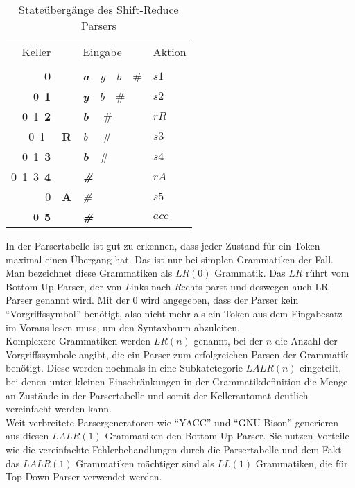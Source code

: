 \begin{table}[H]
  \centering
  \begin{tabular}{r|l|l|l}
    Keller                   &             &  Eingabe                        & Aktion                    \\
    \qquad\qquad\qquad\qquad &             &  \qquad\qquad\qquad\qquad\qquad                        & \qquad                    \\
               \textbf{0}    &             &  \textit{\textbf{a}}\ \ $y$\ \ $b$\ \ $\#$ & $s1$                   \\
    0\         \textbf{1}    &             &  \textit{\textbf{y}}\ \ $b$\ \ $\#$      & $s2$                   \\
    0\ 1\      \textbf{2}    &             &  \textit{\textbf{b}} \ \ $\#$                    & $rR$       \\
    0\ 1\                    & \textbf{R}  &  \textit{b} \ \ $\#$                    & $s3$       \\
    0\ 1\      \textbf{3}    &             &  \textit{\textbf{b}}\ \ $\#$           & $s4$                   \\
    0\ 1\ 3\   \textbf{4}    &             &  \textit{\textbf{\#}}           & $rA$                   \\
                       0     & \textbf{A}  &  \textit{\#}           & $s5$                   \\
    0\         \textbf{5}    &             &  \textit{\textbf{\#}}                          & $acc$
  \end{tabular}
  \caption{Stateübergänge des Shift-Reduce Parsers}
  \label{fig:theory:parser:shiftreducestate}
\end{table}

In der Parsertabelle ist gut zu erkennen, dass jeder Zustand für ein Token maximal einen Übergang hat.
Das ist nur bei simplen Grammatiken der Fall.
Man bezeichnet diese Grammatiken als $LR(0)$ Grammatik.
Das $LR$ rührt vom Bottom-Up Parser, der von \textit{L}inks nach \textit{R}echts parst und deswegen auch LR-Parser genannt wird. 
Mit der $0$ wird angegeben, dass der Parser kein ``Vorgriffssymbol'' benötigt, also nicht mehr als ein Token aus dem Eingabesatz im Voraus lesen muss, um den Syntaxbaum abzuleiten.\\
Komplexere Grammatiken werden $LR(n)$ genannt, bei der $n$ die Anzahl der Vorgriffssymbole angibt, die ein Parser zum erfolgreichen Parsen der Grammatik benötigt.
Diese werden nochmals in eine Subkatetegorie $LALR(n)$ eingeteilt, bei denen unter kleinen Einschränkungen in der Grammatikdefinition die Menge an Zustände in der Parsertabelle und somit der Kellerautomat deutlich vereinfacht werden kann.\\
Weit verbreitete Parsergeneratoren wie ``YACC'' und ``GNU Bison'' generieren aus diesen $LALR(1)$ Grammatiken den Bottom-Up Parser.
Sie nutzen Vorteile wie die vereinfachte Fehlerbehandlungen durch die Parsertabelle und dem Fakt das $LALR(1)$ Grammatiken mächtiger sind als $LL(1)$ Grammatiken, die für Top-Down Parser verwendet werden.\\
